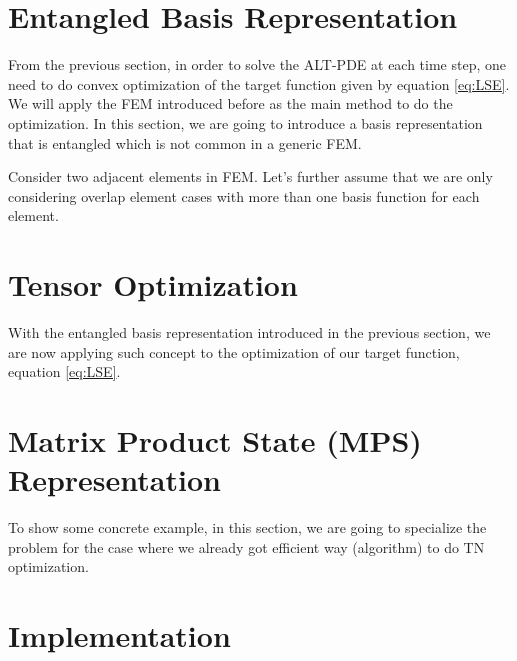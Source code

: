 \documentclass[preprint, 12pt]{revtex4-2}
\numberwithin{equation}{section}
\begin{document}
\section{Entangled Basis Representation}
From the previous section, in order to solve the ALT-PDE at each time step, one need to do convex optimization of the target function given by equation \ref{eq:LSE}. We will apply the FEM introduced before as the main method to do the optimization. In this section, we are going to introduce a basis representation that is entangled which is not common in a generic FEM. 

Consider two adjacent elements in FEM. Let's further assume that we are only considering overlap element cases with more than one basis function for each element. 

\section{Tensor Optimization}
With the entangled basis representation introduced in the previous section, we are now applying such concept to the optimization of our target function, equation \ref{eq:LSE}. 

\section{Matrix Product State (MPS) Representation}
To show some concrete example, in this section, we are going to specialize the problem for the case where we already got efficient way (algorithm) to do TN optimization. 

\section{Implementation}
\end{document}
